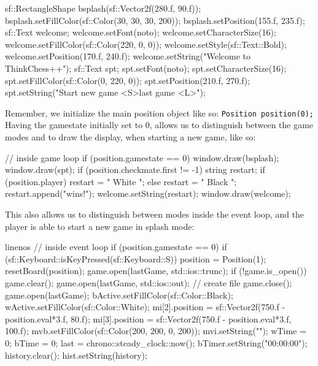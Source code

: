 \begin{cpp}
sf::RectangleShape bsplash(sf::Vector2f(280.f, 90.f));
bsplash.setFillColor(sf::Color(30, 30, 30, 200));
bsplash.setPosition(155.f, 235.f);
sf::Text welcome;
welcome.setFont(noto);
welcome.setCharacterSize(16);
welcome.setFillColor(sf::Color(220, 0, 0));
welcome.setStyle(sf::Text::Bold);
welcome.setPosition(170.f, 240.f);
welcome.setString("Welcome to ThinkChess++");
sf::Text spt;
spt.setFont(noto);
spt.setCharacterSize(16);
spt.setFillColor(sf::Color(0, 220, 0));
spt.setPosition(210.f, 270.f);
spt.setString("Start new game <S>\nLoad last game <L>");
\end{cpp}

Remember, we initialize the main position object like so: \texttt{Position position(0);}\\
Having the gamestate initially set to 0, allows us to distinguish between the game modes and
to draw the display, when starting a new game, like so:

\begin{cpp}
// inside game loop
if (position.gamestate == 0) {
  window.draw(bsplash);
  window.draw(spt);
  if (position.checkmate.first != -1) {
    string restart;
    if (position.player) restart = "      White ";
    else restart = "      Black ";
    restart.append("wins!");
    welcome.setString(restart);
  }
  window.draw(welcome);
}
\end{cpp}

This also allows us to distinguish between modes inside the event loop, and the player is able
to start a new game in splash mode:

\begin{cpp*}{linenos}
// inside event loop
if (position.gamestate == 0) {
  if (sf::Keyboard::isKeyPressed(sf::Keyboard::S)) {
    position = Position(1);
    resetBoard(position);
    game.open(lastGame, std::ios::trunc);
    if (!game.is_open()) {
      game.clear();
      game.open(lastGame, std::ios::out); // create file
      game.close();
      game.open(lastGame);
    }
    bActive.setFillColor(sf::Color::Black);
    wActive.setFillColor(sf::Color::White);
    mi[2].position = sf::Vector2f(750.f - position.eval*3.f, 80.f);
    mi[3].position = sf::Vector2f(750.f - position.eval*3.f, 100.f);
    mvb.setFillColor(sf::Color(200, 200, 0, 200));
    mvi.setString("");
    wTime = 0;
    bTime = 0;
    last = chrono::steady_clock::now();
    bTimer.setString("00:00:00");
    history.clear();
    hist.setString(history);
  }
}
\end{cpp*}

